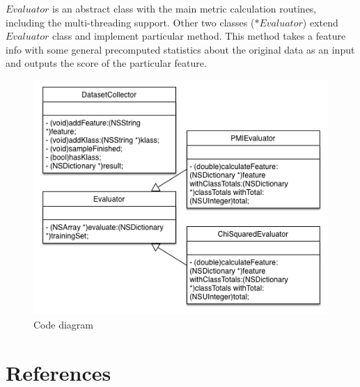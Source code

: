 \documentclass[12pt, english, a4paper]{extarticle}
\begin{document}
$Evaluator$ is an abstract class with the main metric calculation routines, including the multi-threading support. Other two classes ($*Evaluator$) extend $Evaluator$ class and implement particular method. This method takes a feature info with some general precomputed statistics about the original data as an input and outputs the score of the particular feature. 

\begin{figure}[h]
\centering
    \includegraphics[scale=0.55]{code_diagram.png}
    \caption{Code diagram}
    \label{fig_schema}
\end{figure}

\renewcommand\refname{ }
\section{ References }
\nocite{*}


\end{document}
